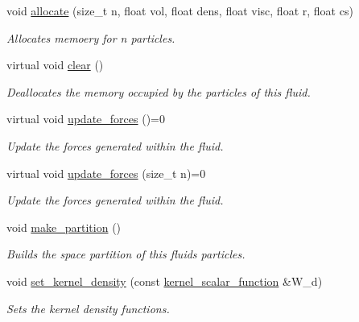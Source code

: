 \begin{DoxyCompactItemize}
void \hyperlink{classphysim_1_1fluids_1_1fluid_a1572bdeaca8942347aa79ee35a112ce6}{allocate} (size\+\_\+t n, float vol, float dens, float visc, float r, float cs)
\begin{DoxyCompactList}\small\item\em Allocates memoery for {\itshape n} particles. \end{DoxyCompactList}\item 
\mbox{\label{classphysim_1_1fluids_1_1fluid_a581b8991d4fd6564c5e0b2a49cacd69c}} 
virtual void \hyperlink{classphysim_1_1fluids_1_1fluid_a581b8991d4fd6564c5e0b2a49cacd69c}{clear} ()
\begin{DoxyCompactList}\small\item\em Deallocates the memory occupied by the particles of this fluid. \end{DoxyCompactList}\item 
virtual void \hyperlink{classphysim_1_1fluids_1_1fluid_a6cde063d44b1e33199c08e64d801bb04}{update\+\_\+forces} ()=0
\begin{DoxyCompactList}\small\item\em Update the forces generated within the fluid. \end{DoxyCompactList}\item 
virtual void \hyperlink{classphysim_1_1fluids_1_1fluid_a08fe6b6111608b3deb3c3ddd84e1ab32}{update\+\_\+forces} (size\+\_\+t n)=0
\begin{DoxyCompactList}\small\item\em Update the forces generated within the fluid. \end{DoxyCompactList}\item 
void \hyperlink{classphysim_1_1fluids_1_1fluid_a06bb3b5ad3676e0e8485cba3ca12cd73}{make\+\_\+partition} ()
\begin{DoxyCompactList}\small\item\em Builds the space partition of this fluid\textquotesingle{}s particles. \end{DoxyCompactList}\item 
void \hyperlink{classphysim_1_1fluids_1_1fluid_a5701d069c23eb7a902fa944af1e55b61}{set\+\_\+kernel\+\_\+density} (const \hyperlink{namespacephysim_1_1fluids_a22c55c76ab3fe3de79dada15e2f9c2d6}{kernel\+\_\+scalar\+\_\+function} \&W\+\_\+d)
\begin{DoxyCompactList}\small\item\em Sets the kernel density functions. \end{DoxyCompactList}\item 

\end{DoxyCompactItemize}
